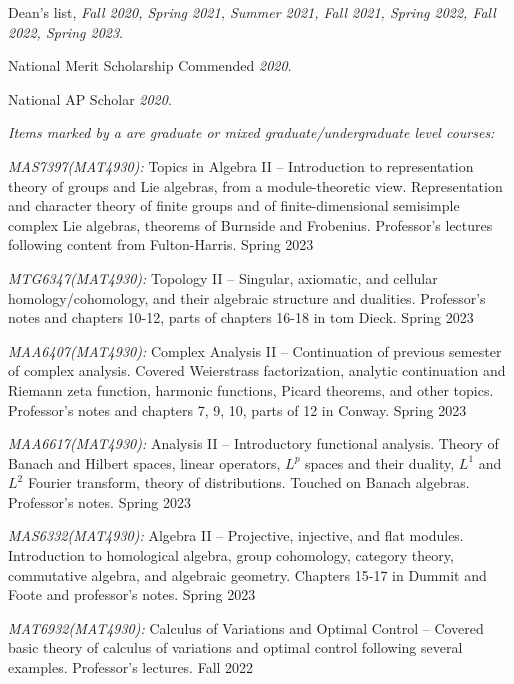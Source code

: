 \documentclass[11pt]{article}
\begin{document}
Dean's list, \textsl{Fall 2020, Spring 2021, Summer 2021, Fall 2021, Spring 2022, Fall 2022, Spring 2023}.

National Merit Scholarship Commended \textsl{2020}.

National AP Scholar \textsl{2020}.


\textsl{Items marked by a \textsuperscript{\textdagger} are graduate or mixed graduate/undergraduate level courses:}

\textsl{MAS7397(MAT4930)\textsuperscript{\textdagger}:} Topics in Algebra II -- Introduction to representation theory of groups and Lie algebras, from a module-theoretic view. Representation and character theory of finite groups and of finite-dimensional semisimple complex Lie algebras, theorems of Burnside and Frobenius. Professor's lectures following content from Fulton-Harris. Spring 2023

\textsl{MTG6347(MAT4930)\textsuperscript{\textdagger}:} Topology II -- Singular, axiomatic, and cellular homology/cohomology, and their algebraic structure and dualities. Professor's notes and chapters 10-12, parts of chapters 16-18 in tom Dieck. Spring 2023

\textsl{MAA6407(MAT4930)\textsuperscript{\textdagger}:} Complex Analysis II -- Continuation of previous semester of complex analysis. Covered Weierstrass factorization, analytic continuation and Riemann zeta function, harmonic functions, Picard theorems, and other topics. Professor's notes and chapters 7, 9, 10, parts of 12 in Conway. Spring 2023

\textsl{MAA6617(MAT4930)\textsuperscript{\textdagger}:} Analysis II -- Introductory functional analysis. Theory of Banach and Hilbert spaces, linear operators, $L^p$ spaces and their duality, $L^1$ and $L^2$ Fourier transform, theory of distributions. Touched on Banach algebras. Professor's notes. Spring 2023

\textsl{MAS6332(MAT4930)\textsuperscript{\textdagger}:} Algebra II -- Projective, injective, and flat modules. Introduction to homological algebra, group cohomology, category theory, commutative algebra, and algebraic geometry. Chapters 15-17 in Dummit and Foote and professor's notes. Spring 2023

\textsl{MAT6932(MAT4930)\textsuperscript{\textdagger}:} Calculus of Variations and Optimal Control -- Covered basic theory of calculus of variations and optimal control following several examples. Professor's lectures. Fall 2022
\end{document}
